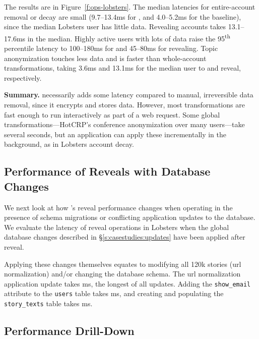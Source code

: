 %
The results are in Figure~\ref{f:ops-lobsters}.
%
The median latencies for entire-account removal or decay are small (9.7--13.4ms
for \sys, and 4.0--5.2ms for the baseline), since the median Lobsters user has
little data. Revealing \xxed accounts takes 13.1--17.6ms in the median.
%
Highly active users with lots of data raise the 95\textsuperscript{th} percentile
latency to 100--180ms for \xxing and 45--80ms for revealing.
%
Topic anonymization touches less data and is faster than
whole-account transformations, taking 3.6ms and 13.1ms for the median user to
\xx and reveal, respectively.
%

\textbf{Summary.}
%
\sys necessarily adds some latency compared to manual, irreversible data
removal, since it encrypts and stores \xxed data.
%
However, most \xxing transformations are fast enough to run interactively as
part of a web request.
%
Some global \xxing transformations---\eg HotCRP's conference anonymization over
many users---take several seconds, but an application can apply these
incrementally in the background, as in Lobsters account decay.
%
%
\subsection{Performance of Reveals with Database Changes}

We next look at how \sys's reveal performance changes when operating in the
presence of schema migrations or conflicting application updates to the database. We
evaluate the latency of reveal operations in Lobsters when the global database
changes described in \S\ref{s:casestudies:updates} have been applied after
reveal.

Applying these changes themselves equates to modifying all 120k stories (\eg url
normalization) and/or changing the database schema.  The url normalization
application update takes ms, the longest of all updates.
%
Adding the \texttt{show\_email} attribute to the \texttt{users} table takes
ms, and 
%
creating and populating the \texttt{story\_texts} table takes ms.%




\subsection{\sys Performance Drill-Down}
\label{s:eval-additional}

